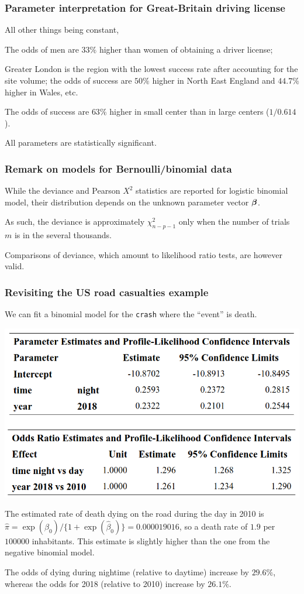 \documentclass{beamer}
\begin{document}
\begin{frame}
 \frametitle{Parameter interpretation for Great-Britain driving license}
 All other things being constant,
 \bi \item The odds of men are $33\%$ higher than women of obtaining a driver license;
 \item Greater London is the region with the lowest success rate after accounting for the site volume; the odds of success are $50\%$ higher in North East England and $44.7\%$ higher in Wales, etc.
  \item The odds of success are $63\%$ higher in small center than in large centers ($1/0.614$).
  \item All parameters are statistically significant.
 \ei 
\end{frame}


\begin{frame}
 \frametitle{Remark on models for Bernoulli/binomial data}
 \bi \item While the deviance and Pearson $X^2$ statistics are reported for logistic binomial model, their distribution depends on the unknown parameter vector $\boldsymbol {\beta}$.
 \item As such, the deviance is approximately $\chi^2_{n-p-1}$ only when the number of trials $m$ is in the several thousands.
 \item Comparisons of deviance, which amount to likelihood ratio tests, are however valid.
  \ei
\end{frame}

\begin{frame}
 \frametitle{Revisiting the US road casualties example}
 We can fit a binomial model for the \texttt{crash} where the ``event'' is death.
 
 \begin{center}
  \includegraphics[width = 0.7\linewidth]{img/c4/slides8-e24}
 \end{center}
 {\small
\bi \item The estimated rate of death dying on the road during the day in 2010 is
$\hat{\pi}=\exp(\hat{\beta}_0)/\{1+\exp(\hat{\beta}_0)\} = 0.000019016$, so a death rate of $1.9$ per $100 000$ inhabitants. This estimate is slightly higher than the one from the negative binomial model.
\item The odds of dying during nightime (relative to daytime) increase by $29.6\%$, whereas the odds for 2018 (relative to 2010) increase by $26.1\%$.
\ei
}
\end{frame}
\end{document}
